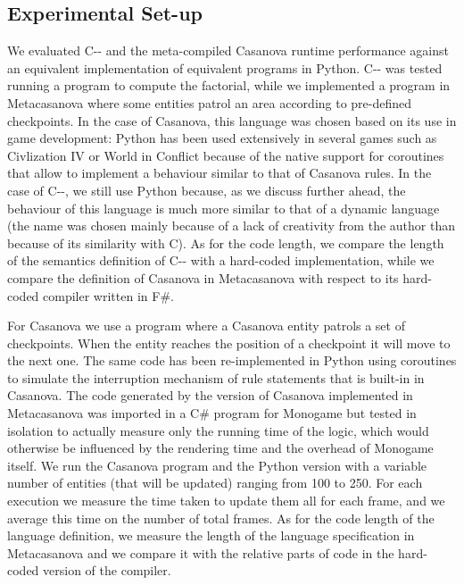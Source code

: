 \subsection{Experimental Set-up}
We evaluated C-{}- and the meta-compiled Casanova runtime performance against an equivalent implementation of equivalent programs in Python. C-{}- was tested running a program to compute the factorial, while we implemented a program in Metacasanova where some entities patrol an area according to pre-defined checkpoints. In the case of Casanova, this language was chosen based on its use in game development: Python has been used extensively in several games such as Civlization IV \cite{CIV4} or World in Conflict \cite{WIC} because of the native support for coroutines that allow to implement a behaviour similar to that of Casanova rules. In the case of C-{}-, we still use Python because, as we discuss further ahead, the behaviour of this language is much more similar to that of a dynamic language (the name was chosen mainly because of a lack of creativity from the author than because of its similarity with C). As for the code length, we compare the length of the semantics definition of C-{}- with a hard-coded implementation, while we compare the definition of Casanova in Metacasanova with respect to its hard-coded compiler written in F\#.

For Casanova we use a program where a Casanova entity patrols a set of checkpoints. When the entity reaches the position of a checkpoint it will move to the next one. The same code has been re-implemented in Python using coroutines to simulate the interruption mechanism of rule statements that is built-in in Casanova. The code generated by the version of Casanova implemented in Metacasanova was imported in a C\# program for Monogame but tested in isolation to actually measure only the running time of the logic, which would otherwise be influenced by the rendering time and the overhead of Monogame itself. We run the Casanova program and the Python version with a variable number of entities (that will be updated) ranging from 100 to 250. For each execution we measure the time taken to update them all for each frame, and we average this time on the number of total frames. As for the code length of the language definition, we measure the length of the language specification in Metacasanova and we compare it with the relative parts of code in the hard-coded version of the compiler.

